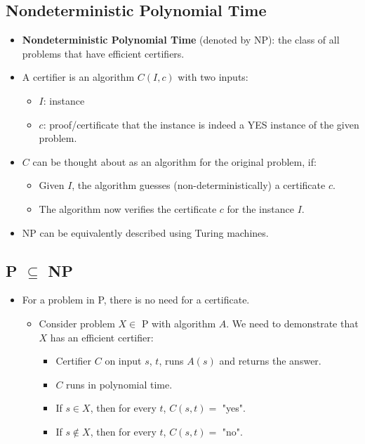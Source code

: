 \subsection{Nondeterministic Polynomial Time}
\begin{itemize}
    \item \textbf{Nondeterministic Polynomial Time} (denoted by NP): the class of all problems that have efficient certifiers.
    \item A certifier is an algorithm $C(I, c)$ with two inputs:
    \begin{itemize}
        \item $I$: instance
        \item $c$: proof/certificate that the instance is indeed a YES instance of the given problem.
    \end{itemize}
    \item $C$ can be thought about as an algorithm for the original problem, if:
    \begin{itemize}
        \item Given $I$, the algorithm guesses (non-deterministically) a certificate $c$.
        \item The algorithm now verifies the certificate $c$ for the instance $I$.
    \end{itemize}
    \item NP can be equivalently described using Turing machines.
\end{itemize}

\subsection{P $\subseteq$ NP}
\begin{itemize}
    \item For a problem in P, there is no need for a certificate.
    \begin{itemize}
        \item Consider problem $X \in$ P with algorithm $A$. We need to demonstrate that $X$ has an efficient certifier:
        \begin{itemize}
            \item Certifier $C$ on input $s$, $t$, runs $A(s)$ and returns the answer.
            \item $C$ runs in polynomial time.
            \item If $s \in X$, then for every $t$, $C(s, t) =$ "yes".
            \item If $s \notin X$, then for every $t$, $C(s, t) =$ "no".
        \end{itemize}
    \end{itemize}
\end{itemize}

